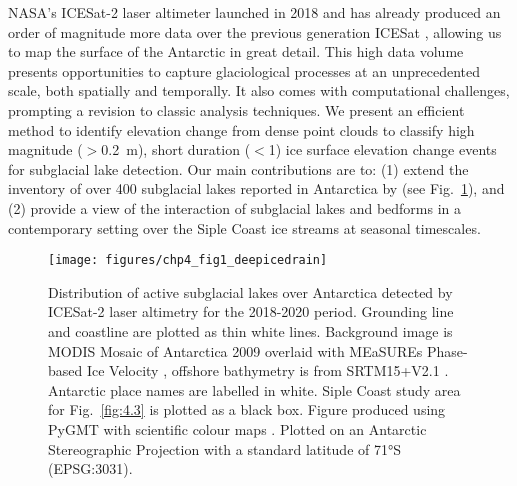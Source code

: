 NASA's ICESat-2 laser altimeter launched in 2018 \citep{MarkusIceCloudland2017,NeumannIceCloudLand2019} and has already produced an order of magnitude more data over the previous generation ICESat \citep[2003-2009;][]{ZwallyICESatlasermeasurements2002,ShumanICESatAntarcticelevation2006}, allowing us to map the surface of the Antarctic in great detail.
This high data volume presents opportunities to capture glaciological processes at an unprecedented scale, both spatially and temporally. %
It also comes with computational challenges, prompting a revision to classic analysis techniques.
We present an efficient method to identify elevation change from dense point clouds to classify high magnitude ($>$\SI{0.2}{\metre}), short duration ($<$\SI{1}{\year}) ice surface elevation change events for subglacial lake detection.
Our main contributions are to:
(1) extend the inventory of over 400 subglacial lakes reported in Antarctica by \citet{SiegfriedThirteenyearssubglacial2018} (see Fig.~\ref{fig:4.1}), and
(2) provide a view of the interaction of subglacial lakes and bedforms in a contemporary setting over the Siple Coast ice streams at seasonal timescales.

\begin{figure}[htbp]
  \texttt{[image: figures/chp4\_fig1\_deepicedrain]}
  \caption[Distribution of ICESat-2 active subglacial lakes from 2018-2020]{
    Distribution of active subglacial lakes over Antarctica detected by ICESat-2 laser altimetry for the 2018-2020 period.
    Grounding line and coastline \citep{DepoorterAntarcticmasksiceshelves2013} are plotted as thin white lines.
    Background image is MODIS Mosaic of Antarctica 2009 \citep{HaranMODISMosaicAntarctica2014} overlaid with MEaSUREs Phase-based Ice Velocity \citep{MouginotMEaSUREsPhaseMap2019}, offshore bathymetry is from SRTM15+V2.1 \citep{TozerGlobalBathymetryTopography2019}.
    Antarctic place names are labelled in white.
    Siple Coast study area for Fig.~\ref{fig:4.3} is plotted as a black box.
    Figure produced using PyGMT \citep{UiedaLeonardoPyGMTPythoninterface2020,WesselGenericMappingTools2019} with scientific colour maps \citep{CrameriScientificcolourmaps2018}.
    Plotted on an Antarctic Stereographic Projection with a standard latitude of 71°S (EPSG:3031).
  }
  \label{fig:4.1}
\end{figure}

